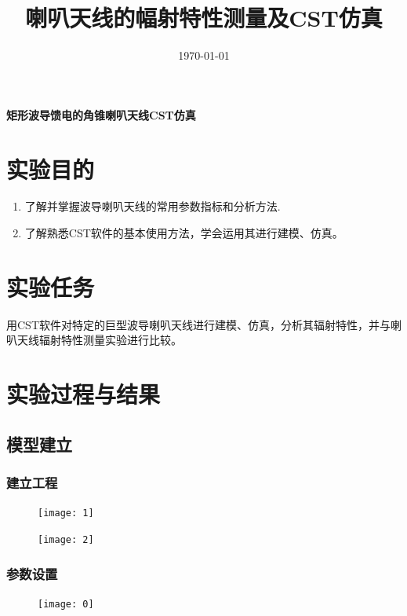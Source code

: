 \documentclass{../source/Experiment}
\title{喇叭天线的幅射特性测量及CST仿真}
\date{\today}
\begin{document}
    \makecover
    \makeheader

    \begin{center}
        \bfseries\Large{矩形波导馈电的角锥喇叭天线CST仿真}
    \end{center}
    \section{实验目的}
        \begin{enumerate}
            \item 了解并掌握波导喇叭天线的常用参数指标和分析方法.
            \item 了解熟悉CST软件的基本使用方法，学会运用其进行建模、仿真。
        \end{enumerate}
    \section{实验任务}
        用CST软件对特定的巨型波导喇叭天线进行建模、仿真，分析其辐射特性，并与喇叭天线辐射特性测量实验进行比较。
    \section{实验过程与结果}
        \subsection{模型建立}
            \subsubsection{建立工程}
                \begin{figure}[H]
                    \centering
                    \texttt{[image: 1]}
                    \caption{}
                \end{figure}

                \begin{figure}[H]
                    \centering
                    \texttt{[image: 2]}
                    \caption{}
                \end{figure}

            \subsubsection{参数设置}
                \begin{figure}[H]
                    \centering
                    \texttt{[image: 0]}
                    \caption{}
                \end{figure}
\end{document}
